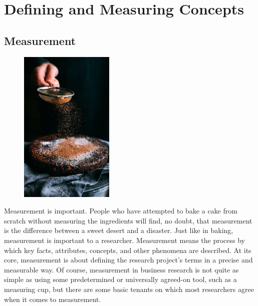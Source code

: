 \chapter{Defining and Measuring Concepts}\label{ch05:measuring}
\section{Measurement}

\begin{figure}
	\label{05:fig01} 
	\centering
	\includegraphics[width=0.4\textwidth]{gfx/05-cake} 
\end{figure}

Measurement is important. People who have attempted to bake a cake from scratch without measuring the ingredients will find, no doubt, that measurement is the difference between a sweet desert and a disaster. Just like in baking, measurement is important to a researcher. Measurement means the process by which key facts, attributes, concepts, and other phenomena are described. At its core, measurement is about defining the research project's terms in a precise and measurable way. Of course, measurement in business research is not quite as simple as using some predetermined or universally agreed-on tool, such as a measuring cup, but there are some basic tenants on which most researchers agree when it comes to measurement.

